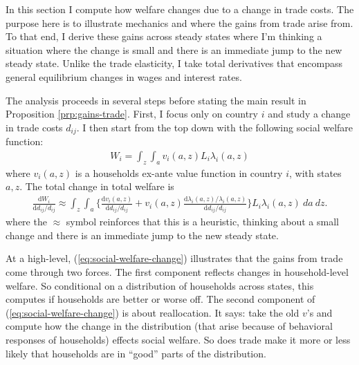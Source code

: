 \documentclass[12pt,pdftex]{article}
\begin{document}
\begin{onehalfspacing}
In this section I compute how welfare changes due to a change in trade costs. The purpose here is to illustrate mechanics and where the gains from trade arise from. To that end, I derive these gains across steady states where I'm thinking a situation where the change is small and there is an immediate jump to the new steady state.  Unlike the trade elasticity, I take total derivatives that encompass general equilibrium changes in wages and interest rates.

The analysis proceeds in several steps before stating the main result in Proposition \ref{prp:gains-trade}. First, I focus only on country $i$ and study a change in trade costs $d_{ij}$. I then start from the top down with the following social welfare function:
\begin{align}
W_{i} = \int_{z} \int_{a}  v_{i}(a,z) L_i \lambda_{i}(a,z)
\label{eq:social-welfare}
\end{align}
where $v_{i}(a,z)$ is a households ex-ante value function in country $i$, with states $a,z$. The total change in total welfare is
\begin{align}
\frac{\mathrm{d} W_{i}}{\mathrm{d} d_{ij} / d_{ij}} \approx \int_{z} \int_{a} \bigg \{ \frac{\mathrm{d} v_i(a, z)}{\mathrm{d} d_{ij} / d_{ij}}  + v_{i}(a,z) \frac{\mathrm{d} \lambda_{i}(a,z)/ \lambda_{i}(a,z)}{\mathrm{d} d_{ij} / d_{ij}}  \bigg \} L_i \lambda_{i}(a,z) \ da \ dz.
\label{eq:social-welfare-change}
\end{align}
where the $\approx$ symbol reinforces that this is a heuristic, thinking about a small change and there is an immediate jump to the new steady state.

At a high-level, (\ref{eq:social-welfare-change}) illustrates that the gains from trade come through two forces. The first component reflects changes in household-level welfare. So conditional on a distribution of households across states, this computes if households are better or worse off. The second component of (\ref{eq:social-welfare-change}) is about reallocation. It says: take the old $v$'s and compute how the change in the distribution (that arise because of behavioral responses of households) effects social welfare. So does trade make it more or less likely that households are in ``good'' parts of the distribution.


\end{onehalfspacing}
\end{document}
